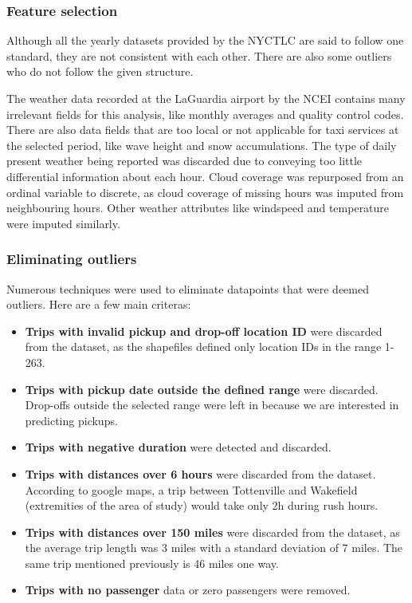 \documentclass[11pt]{article}
\begin{document}
\subsubsection{Feature selection}

Although all the yearly datasets provided by the NYCTLC are said to follow one standard, they are not consistent with each other. There are also some outliers who do not follow the given structure. 

The weather data recorded at the LaGuardia airport by the NCEI \cite{weatherDataGuide} contains many irrelevant fields for this analysis, like monthly averages and quality control codes. There are also data fields that are too local or not applicable for taxi services at the selected period, like wave height and snow accumulations. The type of daily present weather being reported was discarded due to conveying too little differential information about each hour. Cloud coverage was repurposed from an ordinal variable to discrete, as cloud coverage of missing hours was imputed from neighbouring hours. Other weather attributes like windspeed and temperature were imputed similarly.

\subsubsection{Eliminating outliers}

Numerous techniques were used to eliminate datapoints that were deemed outliers. Here are a few main criteras:

\begin{itemize}
    \item \textbf{Trips with invalid pickup and drop-off location ID} were discarded from the dataset, as the shapefiles defined only location IDs in the range 1-263.
    \item \textbf{Trips with pickup date outside the defined range} were discarded. Drop-offs outside the selected range were left in because we are interested in predicting pickups.
    \item \textbf{Trips with negative duration} were detected and discarded.
    \item \textbf{Trips with distances over 6 hours} were discarded from the dataset. According to google maps, a trip between Tottenville and Wakefield (extremities of the area of study) would take only 2h during rush hours.
    \item \textbf{Trips with distances over 150 miles} were discarded from the dataset, as the average trip length was 3 miles with a standard deviation of 7 miles. The same trip mentioned previously is 46 miles one way.
    \item \textbf{Trips with no passenger} data or zero passengers were removed.
\end{itemize}
\end{document}
